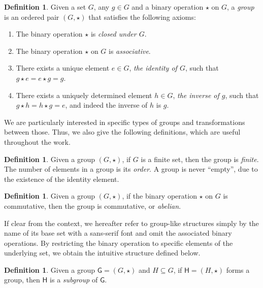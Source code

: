 \documentclass[12pt, a4paper, oneside]{memoir}
\theoremstyle{definition}
\newtheorem{definition}[theorem]{Definition}
\begin{document}
\begin{definition}
  Given a set $G$, any $g \in G$ and a binary operation $\star$ on $G$, a \emph{group} is an ordered pair $(G, \star)$ that satisfies the following axioms:
  
  \begin{enumerate}
    \item The binary operation $\star$ is \emph{closed under $G$}.
    \item The binary operation $\star$ on $G$ is \emph{associative}.
    \item There exists a unique element $e \in G$, \emph{the identity of $G$}, such that $g \star e = e \star g = g$.
    \item There exists a uniquely determined element $h \in G$, \emph{the inverse of $g$}, such that $g \star h = h \star g = e$, and indeed the inverse of $h$ is $g$.
  \end{enumerate}
\end{definition}

We are particularly interested in specific types of groups and transformations between those. Thus, we also give the following definitions, which are useful throughout the work.

\begin{definition}
  Given a group $(G, \star)$, if $G$ is a finite set, then the group is \emph{finite}. The number of elements in a group is its \emph{order}. A group is never ``empty'', due to the existence of the identity element.
\end{definition}

\begin{definition}
  Given a group $(G, \star)$, if the binary operation $\star$ on $G$ is commutative, then the group is commutative, or \emph{abelian}.
\end{definition}

If clear from the context, we hereafter refer to group-like structures simply by the name of its base set with a sans-serif font and omit the associated binary operations. By restricting the binary operation to specific elements of the underlying set, we obtain the intuitive structure defined below.

\begin{definition}
  Given a group $\textsf{G} = (G, \star)$ and $H \subseteq G$, if $\mathsf{H} = (H, \star)$ forms a group, then $\mathsf{H}$ is a \emph{subgroup} of $\mathsf{G}$.
\end{definition}
\end{document}
